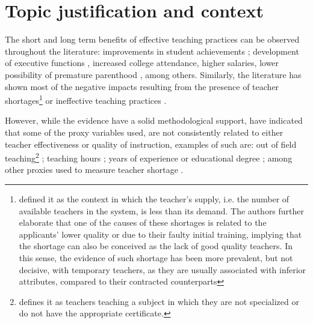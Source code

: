 \section{Topic justification and context}

The short and long term benefits of effective teaching practices can be observed throughout the literature: improvements in student achievements \citep{Rockoff_2004, Rivkin_et_al_2005, Duflo_et_al_2009, Hanushek_et_al_2012, Muralidharan_et_al_2013, Chetty_et_al_2014a, Araujo_et_al_2016}; development of executive functions \citep{Araujo_et_al_2016}, increased college attendance, higher salaries, lower possibility of premature parenthood \citep{Chetty_et_al_2014b}, among others. Similarly, the literature has shown most of the negative impacts resulting from the presence of teacher shortages\footnote{\citet{Bertoni_et_al_2020a} defined it as the context in which the teacher's supply, i.e. the number of available teachers in the system, is less than its demand. The authors further elaborate that one of the causes of these shortages is related to the applicants' lower quality or due to their faulty initial training, implying that the shortage can also be conceived as the lack of good quality teachers. In this sense, the evidence of such shortage has been more prevalent, but not decisive, with temporary teachers, as they are usually associated with inferior attributes, compared to their contracted counterparts} \citep{Duflo_et_al_2009, Muralidharan_et_al_2013, Duflo_et_al_2015, Ayala_2017, Marotta_2019} or ineffective teaching practices \citep{Hanushek_et_al_2012}.

However, while the evidence have a solid methodological support, \citet{Hanushek_et_al_2006} have indicated that some of the proxy variables used, are not consistently related to either teacher effectiveness or quality of instruction, examples of such are: out of field teaching\footnote{\citet{Medeiros_et_al_2018} defines it as teachers teaching a subject in which they are not specialized or do not have the appropriate certificate.} \citep{Ingersoll_1998, Dee_et_al_2008, Bertoni_et_al_2020a}; teaching hours \citep{Bruns_et_al_2015}; years of experience or educational degree \citep{Rockoff_2004, Rivkin_et_al_2005, Clotfelter_et_al_2006, Clotfelter_et_al_2007, Hanushek_et_al_2012}; among other proxies used to measure teacher shortage \citep{Sutcher_et_al_2016}. 

